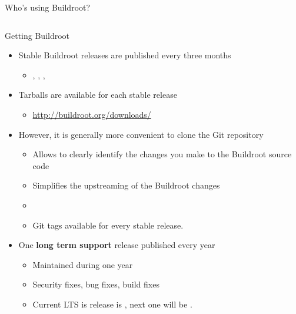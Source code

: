 \begin{frame}{Who's using Buildroot?}
\begin{columns}
  \end{columns}
\end{frame}

\begin{frame}{Getting Buildroot}
  \begin{itemize}
  \item Stable Buildroot releases are published every three months
    \begin{itemize}
    \item {}, , ,
    \end{itemize}
  \item Tarballs are available for each stable release
    \begin{itemize}
    \item \url{http://buildroot.org/downloads/}
    \end{itemize}
  \item However, it is generally more convenient to clone the Git
    repository
    \begin{itemize}
    \item Allows to clearly identify the changes you make to the
      Buildroot source code
    \item Simplifies the upstreaming of the Buildroot changes
    \item {}
    \item Git tags available for every stable release.
    \end{itemize}
  \item One {\bf long term support} release published every year
    \begin{itemize}
    \item Maintained during one year
    \item Security fixes, bug fixes, build fixes
    \item Current LTS is release is , next one will be
      .
    \end{itemize}
  \end{itemize}
\end{frame}

